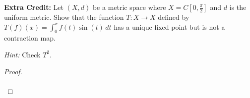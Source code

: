 \textbf{Extra Credit:} Let $(X, d)$ be a metric space where $X = C[0, \frac{\pi}{2}]$ and $d$ is the uniform metric.
Show that the function $T:X \to X$ defined by $T(f)(x) = \int_0^x{f(t)\sin(t) \, dt}$ has a unique fixed point 
but is not a contraction map.

\emph{Hint:} Check $T^2$.

\begin{proof}\renewcommand{\qedsymbol}{}\ \\\\
\end{proof}

